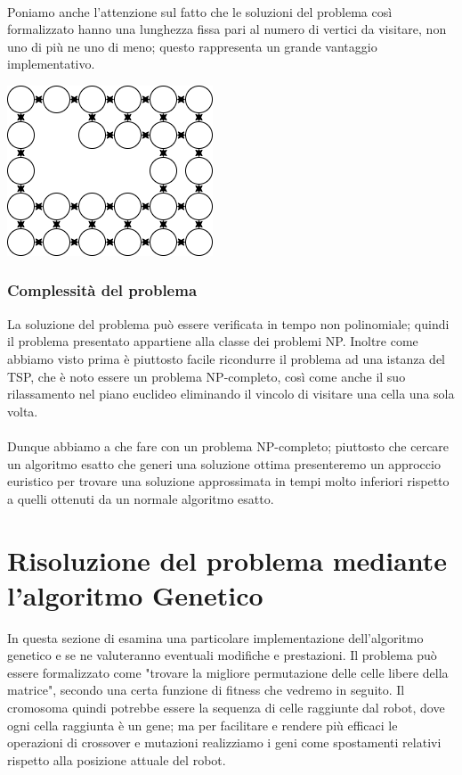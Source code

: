 \documentclass{article}
\begin{document}
\paragraph{}
Poniamo anche l'attenzione sul fatto che le soluzioni del problema così formalizzato hanno una lunghezza fissa pari al numero di vertici da visitare, non uno di più ne uno di meno; questo rappresenta un grande vantaggio implementativo.
\begin{center}
    \includegraphics[scale=0.5]{media/graph}
\end{center}
\subsubsection{Complessità del problema}
La soluzione del problema può essere verificata in tempo non polinomiale; quindi il problema presentato appartiene alla classe dei problemi NP. Inoltre come abbiamo visto prima è piuttosto facile ricondurre il problema ad una istanza del TSP, che è noto essere un problema NP-completo, così come anche il suo rilassamento nel piano euclideo eliminando il vincolo di visitare una cella una sola volta. 
\paragraph{}
Dunque abbiamo a che fare con un problema NP-completo; piuttosto che cercare un algoritmo esatto che generi una soluzione ottima presenteremo un approccio euristico per trovare una soluzione approssimata in tempi molto inferiori rispetto a quelli ottenuti da un normale algoritmo esatto.

\section{Risoluzione del problema mediante l'algoritmo Genetico}
In questa sezione di esamina una particolare implementazione dell'algoritmo genetico \cite{10.1007/978-3-642-01970-8_4} e se ne valuteranno eventuali modifiche e prestazioni.
Il problema può essere formalizzato come "trovare la migliore permutazione delle celle libere della matrice", secondo una certa funzione di fitness che vedremo in seguito. Il cromosoma quindi potrebbe essere la sequenza di celle raggiunte dal robot, dove ogni cella raggiunta è un gene; ma per facilitare e rendere più efficaci le operazioni di crossover e mutazioni realizziamo i geni come spostamenti relativi rispetto alla posizione attuale del robot.
\end{document}
